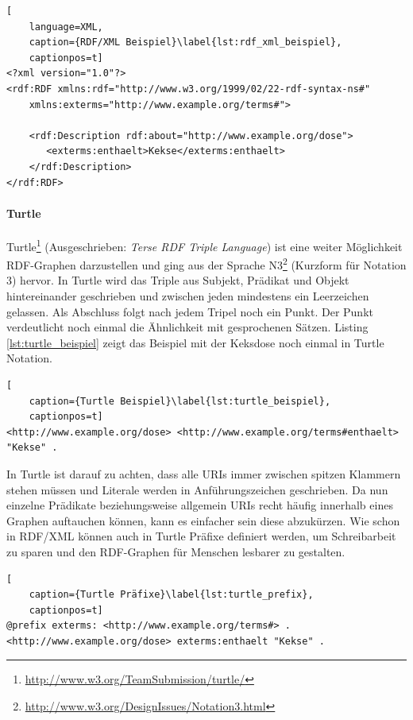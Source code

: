 \begin{lstlisting}[
    language=XML,
    caption={RDF/XML Beispiel}\label{lst:rdf_xml_beispiel},
    captionpos=t]
<?xml version="1.0"?>
<rdf:RDF xmlns:rdf="http://www.w3.org/1999/02/22-rdf-syntax-ns#"
    xmlns:exterms="http://www.example.org/terms#">

    <rdf:Description rdf:about="http://www.example.org/dose">
       <exterms:enthaelt>Kekse</exterms:enthaelt>
    </rdf:Description>
</rdf:RDF>
\end{lstlisting}

\paragraph{Turtle} %
\label{par:turtle}

Turtle\footnote{\url{http://www.w3.org/TeamSubmission/turtle/}} (Ausgeschrieben: \emph{Terse RDF Triple Language}) ist eine weiter Möglichkeit RDF-Graphen darzustellen und ging aus der Sprache N3\footnote{\url{http://www.w3.org/DesignIssues/Notation3.html}} (Kurzform für Notation 3) hervor. In Turtle wird das Triple aus Subjekt, Prädikat und Objekt hintereinander geschrieben und zwischen jeden mindestens ein Leerzeichen gelassen. Als Abschluss folgt nach jedem Tripel noch ein Punkt. Der Punkt verdeutlicht noch einmal die Ähnlichkeit mit gesprochenen Sätzen. Listing \ref{lst:turtle_beispiel} zeigt das Beispiel mit der Keksdose noch einmal in Turtle Notation. 

\begin{lstlisting}[
    caption={Turtle Beispiel}\label{lst:turtle_beispiel},
    captionpos=t]
<http://www.example.org/dose> <http://www.example.org/terms#enthaelt> "Kekse" .
\end{lstlisting} 


In Turtle ist darauf zu achten, dass alle URIs immer zwischen spitzen Klammern stehen müssen und Literale werden in Anführungszeichen geschrieben. Da nun einzelne Prädikate beziehungsweise allgemein URIs recht häufig innerhalb eines Graphen auftauchen können, kann es einfacher sein diese abzukürzen. Wie schon in RDF/XML können auch in Turtle Präfixe definiert werden, um Schreibarbeit zu sparen und den RDF-Graphen für Menschen lesbarer zu gestalten.

\begin{lstlisting}[
    caption={Turtle Präfixe}\label{lst:turtle_prefix},
    captionpos=t]
@prefix exterms: <http://www.example.org/terms#> .
<http://www.example.org/dose> exterms:enthaelt "Kekse" .   
\end{lstlisting}

